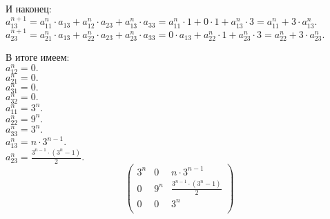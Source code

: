 	И наконец: \\
	$a_{13}^{n+1} = a_{11}^{n} \cdot a_{13} + a_{12}^{n} \cdot a_{23} + a_{13}^{n} \cdot a_{33} = a_{11}^{n} \cdot 1 + 0 \cdot 1 + a_{13}^{n} \cdot 3 = a_{11}^{n} + 3 \cdot a_{13}^{n}.$ \\
	$a_{23}^{n+1} = a_{21}^{n} \cdot a_{13} + a_{22}^{n} \cdot a_{23} + a_{23}^{n} \cdot a_{33} = 0 \cdot a_{13} + a_{22}^{n} \cdot 1 + a_{23}^{n} \cdot 3 = a_{22}^{n} + 3 \cdot a_{23}^{n}.$
	
	В итоге имеем: \\
	$a_{12}^{n} = 0.$ \\
	$a_{21}^{n} = 0.$ \\	
	$a_{31}^{n} = 0.$ \\
	$a_{32}^{n} = 0.$ \\
	$a_{11}^{n} = 3^n.$ \\
	$a_{22}^{n} = 9^{n}.$ \\
	$a_{33}^{n} = 3^{n}.$ \\
	$a_{13}^{n} = n \cdot 3^{n-1}.$ \\
	$a_{23}^{n} = \frac{3^{n-1} \cdot (3^n-1)}{2}.$ \\
	
	\[
	\begin{pmatrix}
	3^{n} & 0  & n \cdot 3^{n-1}  \\
	0  & 9^{n}  &  	\frac{3^{n-1} \cdot (3^n-1)}{2}  \\
	0  & 0  & 3^{n} \\
	\end{pmatrix}
	\]		
	
	
	